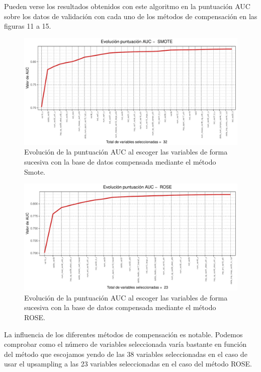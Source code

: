 \documentclass[11pt,a4paper,spanish]{article} %
\begin{document}
Pueden verse los resultados obtenidos con este algoritmo en la puntuación AUC sobre los datos de validación con cada uno de los métodos de compensación en las figuras 11 a 15.


\begin{figure}[h!]
	\begin{center}
	\includegraphics[width=\textwidth]{Z_02_04_Smote.pdf}
    \caption{Evolución de la puntuación AUC al escoger las variables de forma sucesiva con la base de datos compensada mediante el método Smote.}
    \end{center}
\end{figure}


\begin{figure}[h!]
	\begin{center}
	\includegraphics[width=\textwidth]{Z_02_05_ROSE.pdf}
    \caption{Evolución de la puntuación AUC al escoger las variables de forma sucesiva con la base de datos compensada mediante el método ROSE.}
    \end{center}
\end{figure}

\newpage

La influencia de los diferentes métodos de compensación es notable. Podemos comprobar como el número de variables seleccionada varía bastante en función del método que escojamos yendo de las 38 variables seleccionadas en el caso de usar el upsampling a las 23 variables seleccionadas en el caso del método ROSE. 
\end{document}
